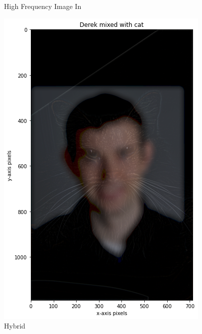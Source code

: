 \documentclass{article}
\begin{document}
\begin{figure}[!htb]
    \caption{High Frequency Image In}\label{fig:awesome_image2}
\endminipage
{}
    \includegraphics[width=\linewidth]{mancat.png}
    \caption{Hybrid}\label{fig:awesome_image2}
\endminipage
\end{figure}
\end{document}
